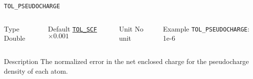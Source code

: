\documentclass[xcolor=dvipsnames,t]{beamer}
\begin{document}
\begin{frame}[allowframebreaks]{\texttt{TOL\_PSEUDOCHARGE}} \label{TOL_PSEUDOCHARGE}
\vspace*{-12pt}
\begin{columns}
\begin{block}{Type}
Double
\end{block}

\begin{block}{Default}
\hyperlink{TOL_SCF}{\texttt{TOL\_SCF}}$\times 0.001$
\end{block}

\begin{block}{Unit}
No unit
\end{block}

\begin{block}{Example}
\texttt{TOL\_PSEUDOCHARGE}: 1e-6
\end{block}
\end{columns}

\begin{block}{Description}
The normalized error in the net enclosed charge for the pseudocharge density of each atom.
\end{block}

\end{frame}
\end{document}
